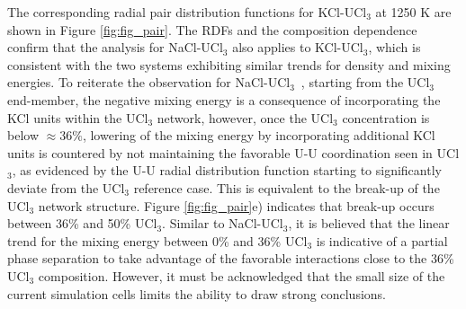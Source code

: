 \documentclass[preprint,3p,10pt,number,sort&compress]{elsarticle}
\begin{document}
The corresponding radial pair distribution functions for KCl-UCl$_3$ at 1250 K are shown in Figure \ref{fig:fig_pair}. The RDFs and the composition dependence confirm that the analysis for NaCl-UCl$_3$ also applies to KCl-UCl$_3$, which is consistent with the two systems exhibiting similar trends for density and mixing energies. To reiterate the observation for NaCl-UCl$_3$~\cite{Andersson}, starting from the UCl$_3$ end-member, the negative mixing energy is a consequence of incorporating the KCl units within the UCl$_3$ network, however, once the UCl$_3$ concentration is below $\approx36\%$, lowering of the mixing energy by incorporating additional KCl units is countered by not maintaining the favorable U-U coordination seen in UCl$_3$, as evidenced by the U-U radial distribution function starting to significantly deviate from the UCl$_3$ reference case. This is equivalent to the break-up of the UCl$_3$ network structure. Figure \ref{fig:fig_pair}e) indicates that break-up occurs between 36\% and 50\% UCl$_3$. Similar to NaCl-UCl$_3$, it is believed that the linear trend for the mixing energy between 0\% and 36\% UCl$_3$ is indicative of a partial phase separation to take advantage of the favorable interactions close to the 36\% UCl$_3$ composition. However, it must be acknowledged that the small size of the current simulation cells limits the ability to draw strong conclusions. 
\end{document}
